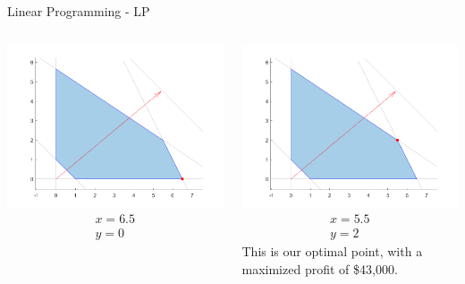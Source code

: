 \documentclass{beamer}
\begin{document}
\begin{frame}{Linear Programming - LP}
\begin{columns}[T]
\begin{column}{0.33\textwidth}
				\includegraphics[width=\textwidth]{images/slides_ex3_simplex2.png}
				\begin{align*}
				x = 6.5\\
				y = 0
				\end{align*}
			\end{column}
			\begin{column}{0.34\textwidth}
				\includegraphics[width=\textwidth]{images/slides_ex3_simplex3.png}
				\begin{align*}
				x = 5.5\\
				y = 2
				\end{align*}
				This is our optimal point, with a maximized profit of \$43,000.
			\end{column}
		\end{columns}
	\end{frame}
	
\end{document}
